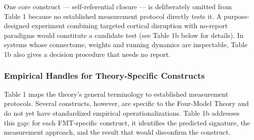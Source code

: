 \documentclass[12pt]{article}
\newcommand{\revstart}{}
\begin{document}
{\revstart One core construct --- self-referential closure --- is deliberately omitted from Table 1 because no established measurement protocol directly tests it. A purpose-designed experiment combining targeted cortical disruption with no-report paradigms \citep{Tsuchiya2015} would constitute a candidate test (see Table 1b below for details). In systems whose connectome, weights and running dynamics are inspectable, Table 1b also gives a decision procedure that needs no report.

\subsubsection{Empirical Handles for Theory-Specific Constructs}

Table 1 maps the theory's general terminology to established measurement protocols. Several constructs, however, are specific to the Four-Model Theory and do not yet have standardized empirical operationalizations. Table 1b addresses this gap: for each FMT-specific construct, it identifies the predicted signature, the measurement approach, and the result that would disconfirm the construct.

}
\end{document}
